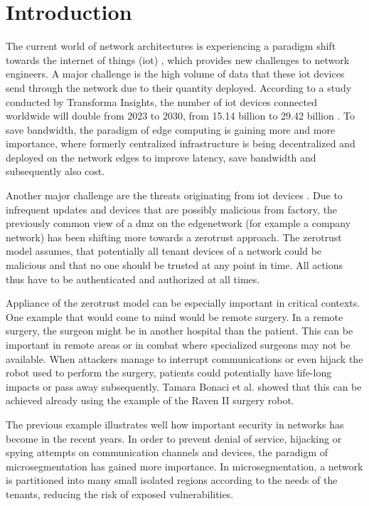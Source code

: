 \chapter{Introduction}

The current world of network architectures is experiencing a paradigm shift towards the internet of things (\acrshort{iot}) \cite{iot}, which provides new challenges to network engineers. A major challenge is the high volume of data that these \acrshort{iot} devices send through the network due to their quantity deployed. According to a study conducted by Transforma Insights, the number of \acrshort{iot} devices connected worldwide will double from 2023 to 2030, from 15.14 billion to 29.42 billion \cite{iotincrease}. To save \gls{bandwidth}, the paradigm of edge computing \cite{edgecomputing} is gaining more and more importance, where formerly centralized infrastructure is being decentralized and deployed on the network edges to improve \gls{latency}, save \gls{bandwidth} and subsequently also cost.

Another major challenge are the threats originating from \acrshort{iot} devices \cite{iotthreats}. Due to infrequent updates and devices that are possibly malicious from factory, the previously common view of a \gls{dmz} on the \gls{edgenetwork} (for example a company network) has been shifting more towards a \gls{zerotrust} approach. The \gls{zerotrust} model \cite{zerotrust} assumes, that potentially all tenant devices of a network could be malicious and that no one should be trusted at any point in time. All actions thus have to be authenticated and authorized at all times.

Appliance of the \gls{zerotrust} model can be especially important in critical contexts. One example that would come to mind would be remote surgery. In a remote surgery, the surgeon might be in another hospital than the patient. This can be important in remote areas or in combat where specialized surgeons may not be available. When attackers manage to interrupt communications or even hijack the robot used to perform the surgery, patients could potentially have life-long impacts or pass away subsequently. Tamara Bonaci et al. \cite{remotesurgeryhijacking} showed that this can be achieved already using the example of the Raven II surgery robot.

The previous example illustrates well how important security in networks has become in the recent years. In order to prevent denial of service, hijacking or spying attempts on communication channels and devices, the paradigm of \gls{microsegmentation} \cite{zerotrust} has gained more importance. In \gls{microsegmentation}, a network is partitioned into many small isolated regions according to the needs of the tenants, reducing the risk of exposed vulnerabilities.

